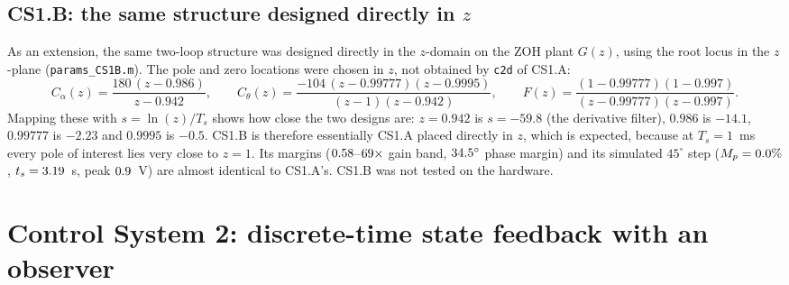 \documentclass[11pt,a4paper]{article}
\begin{document}
\subsection{CS1.B: the same structure designed directly in $z$}
\label{sec:cs1b}
As an extension, the same two-loop structure was designed directly in the
$z$-domain on the ZOH plant $G(z)$, using the root locus in the $z$-plane
(\texttt{params\_CS1B.m}). The pole and zero locations were chosen in $z$,
not obtained by \texttt{c2d} of CS1.A:
\begin{equation}
C_\alpha(z)=\frac{180\,(z-0.986)}{z-0.942},\qquad
C_\theta(z)=\frac{-104\,(z-0.99777)(z-0.9995)}{(z-1)(z-0.942)},\qquad
F(z)=\frac{(1-0.99777)(1-0.997)}{(z-0.99777)(z-0.997)}.
\end{equation}
Mapping these with $s=\ln(z)/T_s$ shows how close the two designs are:
$z=0.942$ is $s=-59.8$ (the derivative filter), $0.986$ is $-14.1$,
$0.99777$ is $-2.23$ and $0.9995$ is $-0.5$. CS1.B is therefore
essentially CS1.A placed directly in $z$, which is expected, because at
$T_s=1$~ms every pole of interest lies very close to $z=1$. Its margins
($0.58$--$69\times$ gain band, $34.5^\circ$ phase margin)
and its simulated $45^\circ$ step ($M_p=0.0\%$, $t_s=3.19$~s,
peak $0.9$~V) are almost identical to CS1.A's. CS1.B was not tested
on the hardware.

\section{Control System 2: discrete-time state feedback with an observer}\label{sec:cs2}
\end{document}
